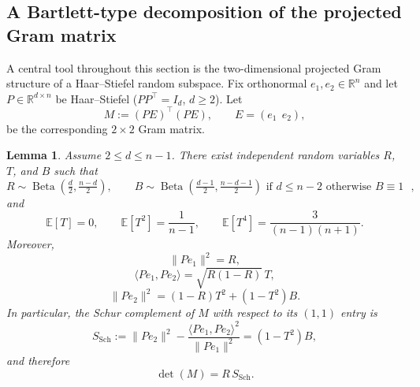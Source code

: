 \documentclass{article}
\DeclareMathOperator{\BetaDist}{Beta}
\newtheorem{lemma}{Lemma}
\begin{document}
\subsection{A Bartlett-type decomposition of the projected Gram matrix}

A central tool throughout this section is the two-dimensional projected Gram structure of a Haar--Stiefel random subspace.
Fix orthonormal $e_1,e_2\in\mathbb R^n$ and let $P\in\mathbb R^{d\times n}$ be Haar--Stiefel ($PP^\top=I_d$, $d\ge 2$).
Let
\[
M:=(PE)^\top(PE),\qquad E=(e_1\ \ e_2),
\]
be the corresponding $2\times 2$ Gram matrix.

\begin{lemma}
\label{lem:Bartlett_prelim}
Assume \(2\le d\le n-1\). There exist independent random variables $R$, $T$, and $B$ such that
\begin{equation}
R\sim \BetaDist\!\left(\tfrac d2,\tfrac{n-d}2\right),
\qquad
B\sim \BetaDist\!\left(\tfrac{d-1}2,\tfrac{n-d-1}2\right) \mbox{ if \(d\le n-2\) otherwise \(B\equiv 1\) },
\label{eq:Bartlett_corrected_dists}
\end{equation}
and
\begin{equation}
\mathbb E[T]=0,
\qquad
\mathbb E[T^2]=\frac{1}{n-1},
\qquad
\mathbb E[T^4]=\frac{3}{(n-1)(n+1)}.
\label{eq:Bartlett_T_moments}
\end{equation}
Moreover,
\begin{equation}
\|Pe_1\|^2 = R,
\label{eq:Bartlett_corrected_R}
\end{equation}
\begin{equation}
\langle Pe_1,Pe_2\rangle = \sqrt{R(1-R)}\,T,
\label{eq:Bartlett_corrected_cross}
\end{equation}
\begin{equation}
\|Pe_2\|^2 = (1-R)T^2 + (1-T^2)B.
\label{eq:Bartlett_corrected_norm2}
\end{equation}
In particular, the Schur complement of $M$ with respect to its $(1,1)$ entry is
\begin{equation}
S_{\mathrm{Sch}}
:=
\|Pe_2\|^2-\frac{\langle Pe_1,Pe_2\rangle^2}{\|Pe_1\|^2}
=
(1-T^2)B,
\label{eq:Bartlett_corrected_schur}
\end{equation}
and therefore
\begin{equation}
\det(M)=R\,S_{\mathrm{Sch}}.
\label{eq:Bartlett_corrected_det}
\end{equation}
\end{lemma}
\end{document}
